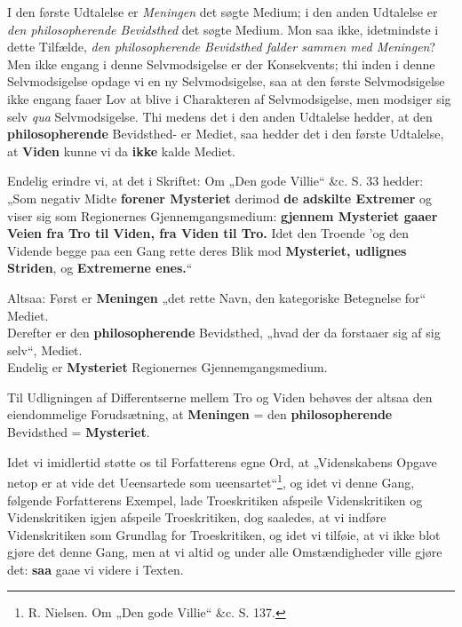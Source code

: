 \documentclass[12pt,a4paper]{book}
\newcommand{\opage}[1]{\marginnote{\footnotesize\textit{[#1]}}}
\begin{document}
I den første Udtalelse er \emph{Meningen} det søgte
Medium; i den anden Udtalelse er \emph{den philosopherende
Bevidsthed} det søgte Medium. Mon saa ikke,
idetmindste i dette Tilfælde, \emph{den philosopherende Bevidsthed
falder sammen med Meningen}? Men
ikke engang i denne Selvmodsigelse er der Konsekvents; thi
inden i denne Selvmodsigelse opdage vi en ny Selvmodsigelse,
saa at den første Selvmodsigelse ikke engang faaer
Lov at blive i Charakteren af Selvmodsigelse, men modsiger
sig selv \textit{qua} Selvmodsigelse. Thi medens det i
den anden Udtalelse hedder, at den \textbf{philosopherende}
Bevidsthed- er Mediet, saa hedder det i den første Udtalelse,
at \textbf{Viden} kunne vi da \textbf{ikke} kalde Mediet.

Endelig erindre vi, at det i Skriftet: Om „Den
gode Villie“ \&c. S. 33 hedder: „Som negativ Midte
\opage{81}\setcounter{footnote}{0}%
\textbf{forener Mysteriet} derimod \textbf{de adskilte Extremer} og
viser sig som Regionernes Gjennemgangsmedium: \textbf{gjennem
Mysteriet gaaer Veien fra Tro til Viden, fra
Viden til Tro.} Idet den Troende ’og den Vidende
begge paa een Gang rette deres Blik mod \textbf{Mysteriet,
udlignes Striden}, og \textbf{Extremerne enes.}“
\par\noindent Altsaa: Først er \textbf{Meningen} „det rette Navn, den
kategoriske Betegnelse for“ Mediet.\\
Derefter er den \textbf{philosopherende} Bevidsthed,
„hvad der da forstaaer sig af sig selv“,
Mediet.\\
Endelig er \textbf{Mysteriet} Regionernes Gjennemgangsmedium.

Til Udligningen af Differentserne mellem Tro
og Viden behøves der altsaa den eiendommelige Forudsætning,
at \textbf{Meningen} = den \textbf{philosopherende} Bevidsthed
= \textbf{Mysteriet}.

Idet vi imidlertid støtte os til Forfatterens egne
Ord, at „Videnskabens Opgave netop er at vide det
Ueensartede som ueensartet“\footnote{R. Nielsen. Om „Den gode Villie“ \&c. S. 137.}, og idet vi denne Gang,
følgende Forfatterens Exempel, lade Troeskritiken afspeile
Videnskritiken og Videnskritiken igjen afspeile
Troeskritiken, dog saaledes, at vi indføre Videnskritiken
som Grundlag for Troeskritiken, og idet vi tilføie,
at vi ikke blot gjøre det denne Gang, men at vi altid
og under alle Omstændigheder ville gjøre det: \textbf{saa} gaae
vi videre i Texten.
\end{document}
